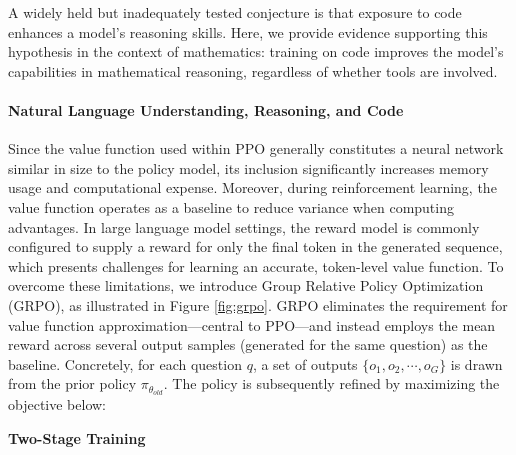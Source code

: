 A widely held but inadequately tested conjecture is that exposure to code enhances a model’s reasoning skills. Here, we provide evidence supporting this hypothesis in the context of mathematics: training on code improves the model’s capabilities in mathematical reasoning, regardless of whether tools are involved.

\paragraph{Natural Language Understanding, Reasoning, and Code}

Since the value function used within PPO generally constitutes a neural network similar in size to the policy model, its inclusion significantly increases memory usage and computational expense. Moreover, during reinforcement learning, the value function operates as a baseline to reduce variance when computing advantages. In large language model settings, the reward model is commonly configured to supply a reward for only the final token in the generated sequence, which presents challenges for learning an accurate, token-level value function. To overcome these limitations, we introduce Group Relative Policy Optimization (GRPO), as illustrated in Figure \ref{fig:grpo}. GRPO eliminates the requirement for value function approximation—central to PPO—and instead employs the mean reward across several output samples (generated for the same question) as the baseline. Concretely, for each question $q$, a set of outputs $\{o_1, o_2, \cdots, o_G\}$ is drawn from the prior policy $\pi_{\theta_{old}}$. The policy is subsequently refined by maximizing the objective below:

\textbf{Two-Stage Training}

